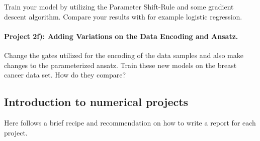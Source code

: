 \documentclass[%
oneside,                 %
final,                   %
10pt]{article}
\begin{document}
Train your model by utilizing the Parameter Shift-Rule and some
gradient descent algorithm. Compare your results with for example
logistic regression.


\paragraph{Project 2f): Adding Variations on the Data Encoding and Ansatz.}
Change the gates utilized for the encoding of the data samples and also make changes to the parameterized ansatz. Train these new models on the breast cancer data set. How do they compare?






\subsection{Introduction to numerical projects}

Here follows a brief recipe and recommendation on how to write a report for each
project.
\end{document}
